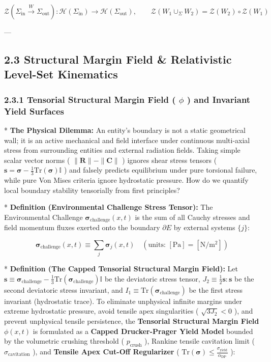 \documentclass[11pt,a4paper]{article}
\theoremstyle{definition}
\theoremstyle{remark}
\begin{document}
\begin{equation}
\boxed{\mathcal{Z}\left( \Sigma_{\text{in}} \xrightarrow{W} \Sigma_{\text{out}} \right): \mathcal{H}\left(\Sigma_{\text{in}}\right) \longrightarrow \mathcal{H}\left(\Sigma_{\text{out}}\right), \qquad \mathcal{Z}\left(W_1 \cup_\Sigma W_2\right) = \mathcal{Z}(W_2) \circ \mathcal{Z}(W_1)}
\end{equation}


---

\subsection{2.3 Structural Margin Field \& Relativistic Level-Set Kinematics}

\subsubsection{2.3.1 Tensorial Structural Margin Field ( $\phi$ ) and Invariant Yield Surfaces}
* \textbf{The Physical Dilemma:} An entity's boundary is not a static geometrical wall; it is an active mechanical and field interface under continuous multi-axial stress from surrounding entities and external radiation fields. Taking simple scalar vector norms ( $\|\mathbf{R}\| - \|\mathbf{C}\|$ ) ignores shear stress tensors ( $\mathbf{s} = \boldsymbol{\sigma} - \frac{1}{3}\mathrm{Tr}(\boldsymbol{\sigma})\mathbb{I}$ ) and falsely predicts equilibrium under pure torsional failure, while pure Von Mises criteria ignore hydrostatic pressure. How do we quantify local boundary stability tensorially from first principles?

* \textbf{Definition (Environmental Challenge Stress Tensor):}
The Environmental Challenge $\boldsymbol{\sigma}_{\text{challenge}}(x, t)$ is the sum of all Cauchy stresses and field momentum fluxes exerted onto the boundary $\partial E$ by external systems $\{j\}$:


\begin{equation}
\boldsymbol{\sigma}_{\text{challenge}}(x, t) \equiv \sum_{j} \boldsymbol{\sigma}_j(x, t) \quad \left( \text{units: } [\mathrm{Pa}] = [\mathrm{N/m^2}] \right)
\end{equation}


* \textbf{Definition (The Capped Tensorial Structural Margin Field):}
Let $\mathbf{s} \equiv \boldsymbol{\sigma}_{\text{challenge}} - \frac{1}{3}\mathrm{Tr}(\boldsymbol{\sigma}_{\text{challenge}})\mathbb{I}$ be the deviatoric stress tensor, $J_2 \equiv \frac{1}{2} \mathbf{s} : \mathbf{s}$ be the second deviatoric stress invariant, and $I_1 \equiv \mathrm{Tr}(\boldsymbol{\sigma}_{\text{challenge}})$ be the first stress invariant (hydrostatic trace).
To eliminate unphysical infinite margins under extreme hydrostatic pressure, avoid tensile apex singularities ( $\sqrt{3 J_2} < 0$ ), and prevent unphysical tensile persistence, the \textbf{Tensorial Structural Margin Field $\phi(x, t)$} is formulated as a \textbf{Capped Drucker-Prager Yield Model} bounded by the volumetric crushing threshold ( $p_{\text{crush}}$ ), Rankine tensile cavitation limit ( $\sigma_{\text{cavitation}}$ ), and \textbf{Tensile Apex Cut-Off Regularizer} ( $\mathrm{Tr}(\boldsymbol{\sigma}) \le \frac{\sigma_{\text{yield}}}{\alpha_{\text{DP}}}$ ):
\end{document}
